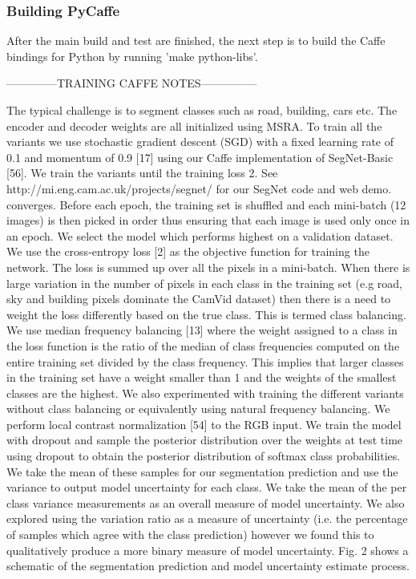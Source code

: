 \subsubsection{Building PyCaffe}

After the main build and test are finished, the next step is to build the Caffe bindings for Python by running 'make python-libs'.

	

\newpage
--------------TRAINING CAFFE NOTES---------------

The typical challenge is to segment classes such as road, building, cars etc. The encoder and decoder weights are all initialized using MSRA. To train all the variants we use stochastic gradient descent (SGD) with a fixed learning rate of 0.1 and momentum of 0.9 [17] using our Caffe implementation of SegNet-Basic [56]. We train the variants until the training loss
2. See http://mi.eng.cam.ac.uk/projects/segnet/ for our SegNet code and web demo.
converges. Before each epoch, the training set is shuffled and each mini-batch (12 images) is then picked in order thus ensuring that each image is used only once in an epoch. We select the model
which performs highest on a validation dataset. We use the cross-entropy loss [2] as the objective function for training the network. The loss is summed up over all the pixels in a mini-batch. When there is large variation in the number of pixels in each class in the training set (e.g road, sky and building
pixels dominate the CamVid dataset) then there is a need to weight the loss differently based on the true class. This is termed class balancing. We use median frequency balancing [13] where the
weight assigned to a class in the loss function is the ratio of the median of class frequencies computed on the entire training set divided by the class frequency. This implies that larger classes in
the training set have a weight smaller than 1 and the weights of the smallest classes are the highest. We also experimented with training the different variants without class balancing or
equivalently using natural frequency balancing.
We perform local contrast normalization [54] to the RGB input. 
We train the model with dropout and sample the posterior distribution over the weights at test time using dropout
to obtain the posterior distribution of softmax class probabilities. We take the mean of these samples for our segmentation prediction and use the variance to output model
uncertainty for each class. We take the mean of the per class
variance measurements as an overall measure of model uncertainty. We also explored using the variation ratio as
a measure of uncertainty (i.e. the percentage of samples
which agree with the class prediction) however we found
this to qualitatively produce a more binary measure of
model uncertainty. Fig. 2 shows a schematic of the segmentation prediction and model uncertainty estimate process.